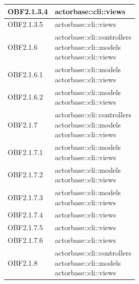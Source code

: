 \documentclass{scalatekids-article}
\begin{document}
\begin{longtable}[H]{|p{3.5cm}|p{7.5cm}|}
\hline
OBF2.1.3.4 & \multiLineCell[t]{actorbase::cli::views\\}\\
\hline
OBF2.1.3.5 & \multiLineCell[t]{actorbase::cli::views\\}\\
\hline
OBF2.1.6 & \multiLineCell[t]{actorbase::cli::controllers\\actorbase::cli::models\\actorbase::cli::views\\}\\
\hline
OBF2.1.6.1 & \multiLineCell[t]{actorbase::cli::models\\actorbase::cli::views\\}\\
\hline
OBF2.1.6.2 & \multiLineCell[t]{actorbase::cli::models\\actorbase::cli::views\\}\\
\hline
OBF2.1.7 & \multiLineCell[t]{actorbase::cli::controllers\\actorbase::cli::models\\actorbase::cli::views\\}\\
\hline
OBF2.1.7.1 & \multiLineCell[t]{actorbase::cli::models\\actorbase::cli::views\\}\\
\hline
OBF2.1.7.2 & \multiLineCell[t]{actorbase::cli::models\\actorbase::cli::views\\}\\
\hline
OBF2.1.7.3 & \multiLineCell[t]{actorbase::cli::models\\actorbase::cli::views\\}\\
\hline
OBF2.1.7.4 & \multiLineCell[t]{actorbase::cli::views\\}\\
\hline
OBF2.1.7.5 & \multiLineCell[t]{actorbase::cli::views\\}\\
\hline
OBF2.1.7.6 & \multiLineCell[t]{actorbase::cli::views\\}\\
\hline
OBF2.1.8 & \multiLineCell[t]{actorbase::cli::controllers\\actorbase::cli::models\\actorbase::cli::views\\}\\
\hline

\end{longtable}
\end{document}
